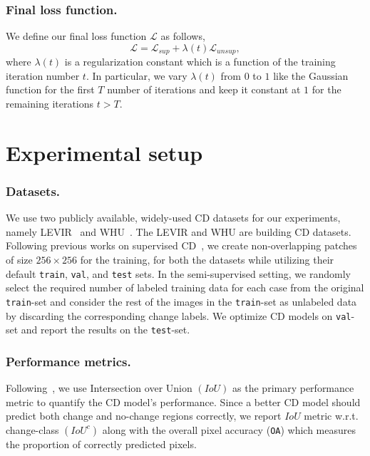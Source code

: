 \documentclass[runningheads]{llncs}
\begin{document}
\subsubsection{Final loss function.} We define our final loss function $\mathcal{L}$ as follows,
\begin{equation}
    \mathcal{L} = \mathcal{L}_{sup} + \lambda (t) \mathcal{L}_{unsup},
\end{equation}
where $\lambda(t)$ is a regularization constant which is a function of the training iteration number $t$. In particular, we vary $\lambda(t)$ from $0$ to $1$ like the Gaussian function for the first $T$ number of iterations and keep it constant at $1$ for the remaining iterations $t>T$.
\vspace{-5mm}
\section{Experimental setup}
\subsubsection{Datasets.} 
\vspace{-4mm}
We use two publicly available, widely-used CD datasets for our experiments, namely LEVIR~\cite{levid-cd} and WHU~\cite{whu-cd}. The LEVIR and WHU are building CD datasets. Following previous works on supervised CD~\cite{bit,changeformer}, we create non-overlapping patches of size $256 \times 256$ for the training, for both the datasets while utilizing their default \texttt{train}, \texttt{val}, and \texttt{test} sets. In the semi-supervised setting, we randomly select the required number of labeled training data for each case from the original \texttt{train}-set and consider the rest of the images in the \texttt{train}-set as unlabeled data by discarding the corresponding change labels. We optimize CD models on \texttt{val}-set and report the results on the \texttt{test}-set.
\vspace{-5mm}
\subsubsection{Performance metrics.} Following~\cite{bit,changeformer}, we use Intersection over Union $(IoU)$ as the primary performance metric to quantify the CD model's performance. Since a better CD model should predict both change and no-change regions correctly, we report $IoU$ metric w.r.t. change-class $(IoU^{c})$ along with the overall pixel accuracy (\texttt{OA}) which measures the proportion of correctly predicted pixels.
\vspace{-5mm}
\end{document}
